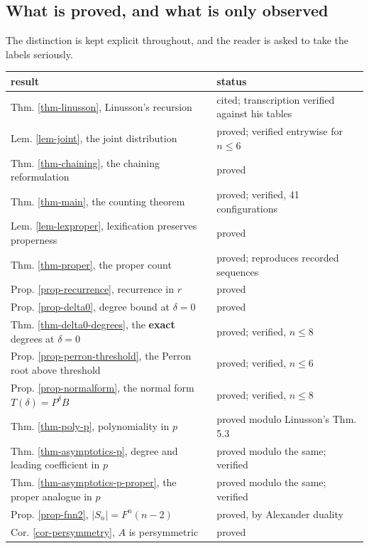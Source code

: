 \documentclass[11pt, a4paper, abstract=yes]{scrartcl}
\theoremstyle{definition}
\theoremstyle{remark}
\theoremstyle{plain}
\begin{document}
\subsection{What is proved, and what is only observed}
\label{sec:orgfc4a2f1}

The distinction is kept explicit throughout, and the reader is asked to take the labels seriously.

\begin{center}
\small
\begin{tabular}{ll}
result & status\\
\hline
Thm. \ref{thm-linusson}, Linusson's recursion & cited; transcription verified against his tables\\
Lem. \ref{lem-joint}, the joint distribution & proved; verified entrywise for \(n\le6\)\\
Thm. \ref{thm-chaining}, the chaining reformulation & proved\\
Thm. \ref{thm-main}, the counting theorem & proved; verified, 41 configurations\\
Lem. \ref{lem-lexproper}, lexification preserves properness & proved\\
Thm. \ref{thm-proper}, the proper count & proved; reproduces recorded sequences\\
Prop. \ref{prop-recurrence}, recurrence in \(r\) & proved\\
Prop. \ref{prop-delta0}, degree bound at \(\delta=0\) & proved\\
Thm. \ref{thm-delta0-degrees}, the \textbf{exact} degrees at \(\delta=0\) & proved; verified, \(n\le8\)\\
Prop. \ref{prop-perron-threshold}, the Perron root above threshold & proved; verified, \(n\le6\)\\
Prop. \ref{prop-normalform}, the normal form \(T(\delta)=P^{\delta}B\) & proved; verified, \(n\le8\)\\
Thm. \ref{thm-poly-p}, polynomiality in \(p\) & proved modulo Linusson's Thm. 5.3\\
Thm. \ref{thm-asymptotics-p}, degree and leading coefficient in \(p\) & proved modulo the same; verified\\
Thm. \ref{thm-asymptotics-p-proper}, the proper analogue in \(p\) & proved modulo the same; verified\\
Prop. \ref{prop-fnn2}, \(\lvert S_n\rvert=F^n(n-2)\) & proved, by Alexander duality\\
Cor. \ref{cor-persymmetry}, \(A\) is persymmetric & proved\\
\end{tabular}
\end{center}
\end{document}
